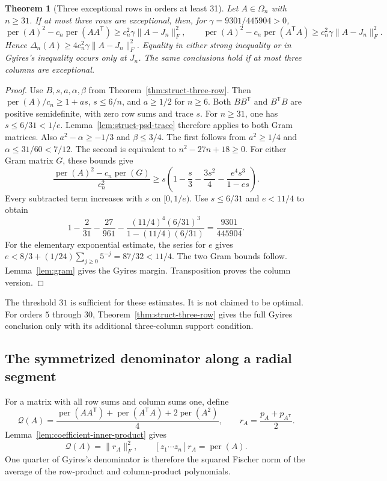 \documentclass[11pt,a4paper]{article}
\newtheorem{theorem}{Theorem}[section]
\theoremstyle{definition}
\theoremstyle{remark}
\newcommand{\per}{\operatorname{per}}
\newcommand{\T}{\mathsf{T}}
\begin{document}
\begin{theorem}[Three exceptional rows in orders at least 31]\label{thm:struct-three-row-31}
Let $A\in\Omega_n$ with $n\ge31$.
If at most three rows are exceptional, then, for
$\gamma=9301/445904>0$,
\[
 \per(A)^2-c_n\per(AA^\T)\ge c_n^2\gamma\|A-J_n\|_F^2,
 \qquad
 \per(A)^2-c_n\per(A^\T A)\ge c_n^2\gamma\|A-J_n\|_F^2.
\]
Hence
$\Delta_n(A)\ge4c_n^2\gamma\|A-J_n\|_F^2$.
Equality in either strong inequality or in Gyires's inequality occurs only at $J_n$.
The same conclusions hold if at most three columns are exceptional.
\end{theorem}

\begin{proof}
Use $B,s,a,\alpha,\beta$ from Theorem~\ref{thm:struct-three-row}.
Then $\per(A)/c_n\ge1+as$, $s\le6/n$, and $a\ge1/2$ for $n\ge6$.
Both $BB^\T$ and $B^\T B$ are positive semidefinite, with zero row sums and trace $s$.
For $n\ge31$, one has $s\le6/31<1/e$.
Lemma~\ref{lem:struct-psd-trace} therefore applies to both Gram matrices.
Also $a^2-\alpha\ge-1/3$ and $\beta\le3/4$.
The first follows from $a^2\ge1/4$ and $\alpha\le31/60<7/12$.
The second is equivalent to $n^2-27n+18\ge0$.
For either Gram matrix $G$, these bounds give
\[
 \frac{\per(A)^2-c_n\per(G)}{c_n^2}
 \ge s\left(1-\frac s3-\frac{3s^2}4-\frac{e^4s^3}{1-es}\right).
\]
Every subtracted term increases with $s$ on $[0,1/e)$.
Use $s\le6/31$ and $e<11/4$ to obtain
\[
 1-\frac2{31}-\frac{27}{961}
 -\frac{(11/4)^4(6/31)^3}{1-(11/4)(6/31)}
 =\frac{9301}{445904}.
\]
For the elementary exponential estimate, the series for $e$ gives
$e<8/3+(1/24)\sum_{j\ge0}5^{-j}=87/32<11/4$.
The two Gram bounds follow.
Lemma~\ref{lem:gram} gives the Gyires margin.
Transposition proves the column version.
\end{proof}

The threshold $31$ is sufficient for these estimates.
It is not claimed to be optimal.
For orders $5$ through $30$, Theorem~\ref{thm:struct-three-row} gives the full Gyires conclusion only with its additional three-column support condition.

\subsection{The symmetrized denominator along a radial segment}

For a matrix with all row sums and column sums one, define
\[
 \mathcal Q(A)=\frac{\per(AA^\T)+\per(A^\T A)+2\per(A^2)}4,
 \qquad r_A=\frac{p_A+p_{A^\T}}2.
\]
Lemma~\ref{lem:coefficient-inner-product} gives
\[
 \mathcal Q(A)=\|r_A\|_F^2,
 \qquad [z_1\cdots z_n]r_A=\per(A).
\]
One quarter of Gyires's denominator is therefore the squared Fischer norm of the average of the row-product and column-product polynomials.
\end{document}

